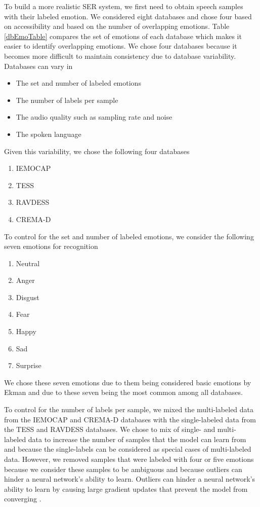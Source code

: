 To build a more realistic SER system, we first need to obtain speech samples with their labeled emotion. We considered eight databases and chose four based on accessibility and based on the number of overlapping emotions. Table \ref{dbEmoTable} compares the set of emotions of each database which makes it easier to identify overlapping emotions. We chose four databases because it becomes more difficult to maintain consistency due to database variability. Databases can vary in
\begin{itemize}
	\item The set and number of labeled emotions
	\item The number of labels per sample
	\item The audio quality such as sampling rate and noise
	\item The spoken language
\end{itemize}
Given this variability, we chose the following four databases
\begin{enumerate}
	\item IEMOCAP \cite{busso_2008}
	\item TESS \cite{dupuis_2011}
	\item RAVDESS \cite{livingstone_2018}
	\item CREMA-D \cite{cao_2014}
\end{enumerate}

To control for the set and number of labeled emotions, we consider the following seven emotions for recognition
\begin{enumerate}
	\item Neutral
	\item Anger
	\item Disgust
	\item Fear
	\item Happy
	\item Sad
	\item Surprise
\end{enumerate}
We chose these seven emotions due to them being considered basic emotions by Ekman \cite{Ekman1992} and due to these seven being the most common among all databases. 

To control for the number of labels per sample, we mixed the multi-labeled data from the IEMOCAP and CREMA-D databases with the single-labeled data from the TESS and RAVDESS databases. We chose to mix of single- and multi- labeled data to increase the number of samples that the model can learn from and because the single-labels can be considered as special cases of multi-labeled data. However, we removed samples that were labeled with four or five emotions because we consider these samples to be ambiguous and because outliers can hinder a neural network's ability to learn. Outliers can hinder a neural network's ability to learn by causing large gradient updates that prevent the model from converging \cite{Chollet2017}.

